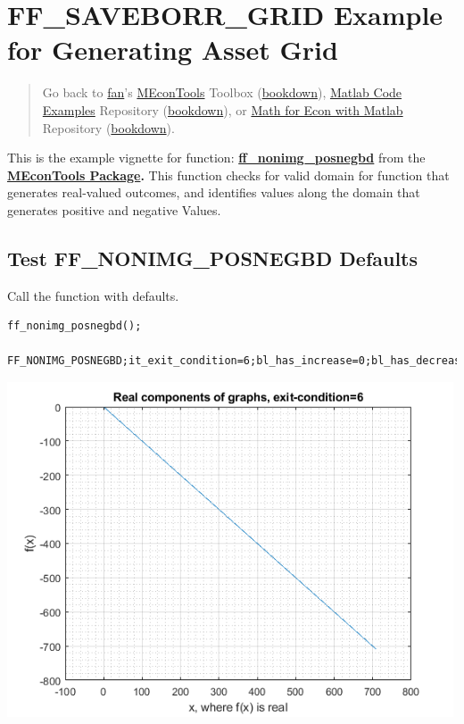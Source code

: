 \documentclass[
]{book}
\begin{document}
\hypertarget{ff_saveborr_grid-example-for-generating-asset-grid-1}{%
\section{FF\_SAVEBORR\_GRID Example for Generating Asset Grid}\label{ff_saveborr_grid-example-for-generating-asset-grid-1}}

\begin{quote}
Go back to \href{http://fanwangecon.github.io/}{fan}'s \href{https://fanwangecon.github.io/MEconTools/}{MEconTools} Toolbox (\href{https://fanwangecon.github.io/MEconTools/bookdown}{bookdown}), \href{https://fanwangecon.github.io/M4Econ/}{Matlab Code Examples} Repository (\href{https://fanwangecon.github.io/M4Econ/bookdown}{bookdown}), or \href{https://fanwangecon.github.io/Math4Econ/}{Math for Econ with Matlab} Repository (\href{https://fanwangecon.github.io/Math4Econ/bookdown}{bookdown}).
\end{quote}

This is the example vignette for function:
\href{https://github.com/FanWangEcon/MEconTools/blob/master/MEconTools/generate/ff_nonimg_posnegbd.m}{\textbf{ff\_nonimg\_posnegbd}}
from the \href{https://fanwangecon.github.io/MEconTools/}{\textbf{MEconTools
Package}}\textbf{.} This function
checks for valid domain for function that generates real-valued
outcomes, and identifies values along the domain that generates positive
and negative Values.

\hypertarget{test-ff_nonimg_posnegbd-defaults}{%
\subsection{Test FF\_NONIMG\_POSNEGBD Defaults}\label{test-ff_nonimg_posnegbd-defaults}}

Call the function with defaults.

\begin{verbatim}
ff_nonimg_posnegbd();

FF_NONIMG_POSNEGBD;it_exit_condition=6;bl_has_increase=0;bl_has_decrease=1;bl_has_constant=0;bl_has_pos=0;bl_has_neg=1;bl_has_zero=0
\end{verbatim}

\includegraphics[width=5.20833in,height=\textheight]{img/fx_nonimg_posnegbd_images/figure_0.png}
\end{document}
